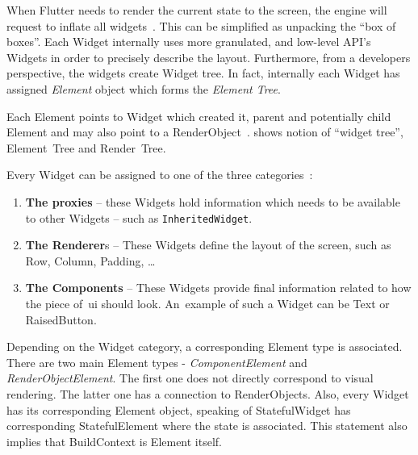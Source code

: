 When Flutter needs to render the current state to the screen, the engine will request to inflate all widgets~\cite{didier-internals}. This can be simplified as unpacking the ``box of boxes''. Each Widget internally uses more granulated, and low-level API's Widgets in order to precisely describe the layout. Furthermore, from a developers perspective, the widgets create Widget tree. In fact, internally each Widget has assigned \textit{Element} object which forms the \textit{Element Tree}.

Each Element points to Widget which created it, parent and potentially child Element and may also point to a RenderObject~\cite{didier-internals}.   shows notion of ``widget tree'', Element~Tree and Render~Tree.

Every Widget can be assigned to one of the three categories~\cite{didier-internals}:
\begin{enumerate}
\item \textbf{The proxies}  -- these Widgets hold information which needs to be available to other Widgets -- such as \verb|InheritedWidget|.
\item \textbf{The Renderer}s -- These Widgets define the layout of the screen, such as Row, Column, Padding, \ldots
\item \textbf{The Components} -- These Widgets provide final information related to how the piece of~\gls{ui} should look. An~example of such a Widget can be Text or RaisedButton. 
\end{enumerate}
Depending on the Widget category, a corresponding Element type is associated. There are two main Element types - \textit{ComponentElement} and \textit{RenderObjectElement}. The first one does not directly correspond to visual rendering. The latter one has a connection to RenderObjects.  Also, every Widget has its corresponding Element object, speaking of StatefulWidget has corresponding StatefulElement where the state is associated. This statement also implies that BuildContext is Element itself. 
